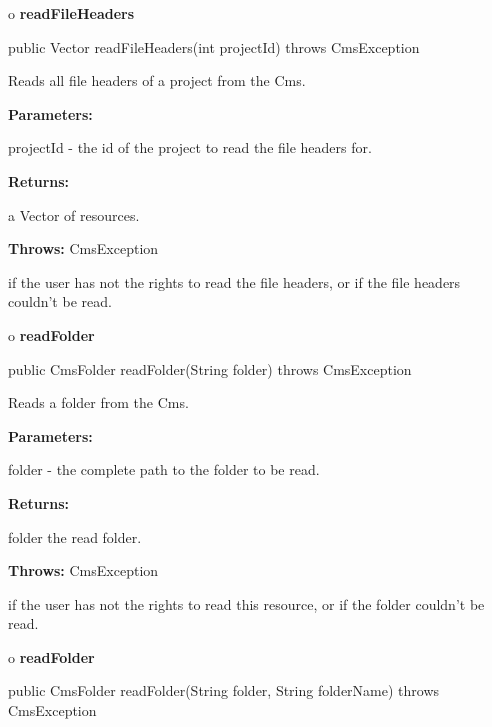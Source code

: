 o {\bf readFileHeaders} 

\begin{PRE}
 public Vector readFileHeaders(int projectId) throws CmsException
\end{PRE}

\begin{description}
\htmlDD Reads all file headers of a project from the Cms. 

\begin{description}
\item {\bf Parameters:}  

projectId - the id of the project to read the file headers for.  
\item {\bf Returns:}  

a Vector of resources.  
\item {\bf Throws:} CmsException  

if the user has not the rights to read the file headers, or if the file
headers couldn't be read.  
\end{description}

\end{description}

o {\bf readFolder} 

\begin{PRE}
 public CmsFolder readFolder(String folder) throws CmsException
\end{PRE}

\begin{description}
\htmlDD Reads a folder from the Cms. 

\begin{description}
\item {\bf Parameters:}  

folder - the complete path to the folder to be read.  
\item {\bf Returns:}  

folder the read folder.  
\item {\bf Throws:} CmsException  

if the user has not the rights to read this resource, or if the folder
couldn't be read.  
\end{description}

\end{description}

o {\bf readFolder} 

\begin{PRE}
 public CmsFolder readFolder(String folder,
                             String folderName) throws CmsException
\end{PRE}

